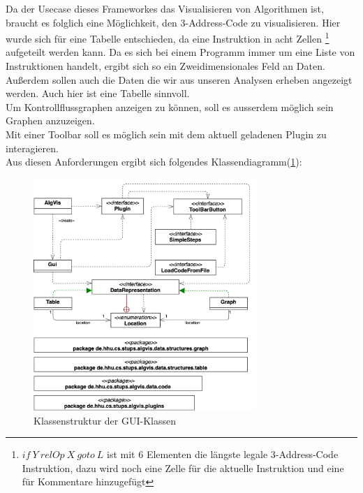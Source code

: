 \newpage
Da der Usecase dieses Frameworkes das Visualisieren von Algorithmen ist, 
braucht es folglich eine Möglichkeit, den 3-Address-Code zu visualisieren.
Hier wurde sich für eine Tabelle entschieden, da eine Instruktion in acht Zellen
\footnote{$if\ Y\ relOp\ X\ goto\ L$ ist mit 6 Elementen die längste legale 3-Address-Code Instruktion,
dazu wird noch eine Zelle für die aktuelle Instruktion und eine für Kommentare hinzugefügt} 
aufgeteilt werden kann. Da es sich bei einem Programm immer um
eine Liste von Instruktionen handelt, ergibt sich so ein Zweidimensionales Feld an Daten.
Außerdem sollen auch die Daten die wir aus unseren Analysen erheben
angezeigt werden. Auch hier ist eine Tabelle sinnvoll.\\

Um Kontrollflussgraphen anzeigen zu können, soll es ausserdem möglich sein
Graphen anzuzeigen.\\

Mit einer Toolbar soll es möglich sein mit dem aktuell geladenen Plugin zu interagieren.\\


Aus diesen Anforderungen ergibt sich folgendes Klassendiagramm(\cref{fig:gui-classes}):\\
\begin{figure}[h]
  \centering
  \vspace{-15pt}
  \includegraphics[width=0.75\textwidth]{fig/GUI_classes.png}
  \vspace{-10pt}
  \caption{Klassenstruktur der GUI-Klassen}%
  \label{fig:gui-classes}
\end{figure}
\vspace{-20pt}

